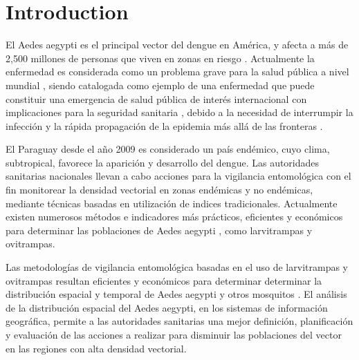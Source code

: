 \section{Introduction}
El Aedes aegypti es el principal vector del dengue en América, y afecta a más de 2,500 millones
de personas que viven en zonas en riesgo \cite{world2009dengue, gustavo2006dengue}. Actualmente la enfermedad es considerada como un problema grave para la salud pública a nivel mundial
\cite{dengueUruguayCap1, world2009dengue, DIBO2005}, siendo catalogada como ejemplo de una
enfermedad que puede constituir una emergencia de salud pública de interés internacional con
implicaciones para la seguridad sanitaria \cite{dengueUruguayCap1, world2009dengue}, debido a la
necesidad de interrumpir la infección y la rápida propagación de la epidemia más allá de las
fronteras \cite{world2009dengue}.

El Paraguay desde el año 2009 es considerado un país endémico, cuyo clima, subtropical, favorece
la aparición y desarrollo del dengue. Las autoridades sanitarias nacionales llevan a cabo
acciones para la vigilancia entomológica con el fin monitorear la densidad vectorial en zonas
endémicas y no endémicas, mediante técnicas basadas en utilización de indices tradicionales.
Actualmente existen numerosos métodos e indicadores más prácticos, eficientes y económicos para
determinar las poblaciones de Aedes aegypti \cite{cenaprece2013}, como larvitrampas y ovitrampas.

Las metodologías de vigilancia entomológica basadas en el uso de larvitrampas y ovitrampas
resultan eficientes y económicos para determinar determinar la distribución espacial y temporal de
Aedes aegypti y otros mosquitos \cite{dengueUruguayCap1, cenaprece2013}. El análisis de la
distribución espacial del Aedes aegypti, en los sistemas de información geográfica, permite a las
autoridades sanitarias una mejor definición, planificación y evaluación de las acciones a realizar
para disminuir las poblaciones del vector en las regiones con alta densidad vectorial.
